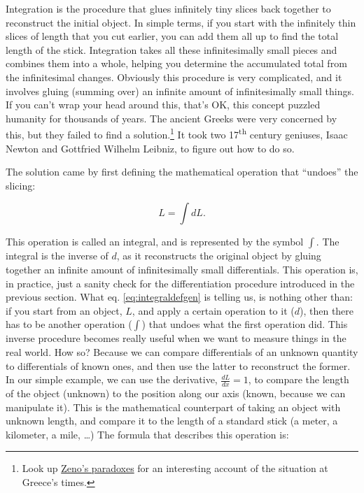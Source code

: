\documentclass[
  9pt,
]{extbook}
\theoremstyle{definition}
\theoremstyle{definition}
\theoremstyle{definition}
\theoremstyle{remark}
\begin{document}
Integration is the procedure that glues infinitely tiny slices back together to reconstruct the initial object. In simple terms, if you start with the infinitely thin slices of length that you cut earlier, you can add them all up to find the total length of the stick. Integration takes all these infinitesimally small pieces and combines them into a whole, helping you determine the accumulated total from the infinitesimal changes. Obviously this procedure is very complicated, and it involves gluing (summing over) an infinite amount of infinitesimally small things. If you can't wrap your head around this, that's OK, this concept puzzled humanity for thousands of years. The ancient Greeks were very concerned by this, but they failed to find a solution.\footnote{Look up \href{https://en.wikipedia.org/wiki/Zeno\%27s_paradoxes}{Zeno's paradoxes} for an interesting account of the situation at Greece's times.} It took two 17\textsuperscript{th} century geniuses, Isaac Newton and Gottfried Wilhelm Leibniz, to figure out how to do so.

The solution came by first defining the mathematical operation that ``undoes'' the slicing:

\begin{equation}
L = \int dL.
\label{eq:integraldefgen}
\end{equation}

This operation is called an integral, and is represented by the symbol \(\int\). The integral is the inverse of \(d\), as it reconstructs the original object by gluing together an infinite amount of infinitesimally small differentials. This operation is, in practice, just a sanity check for the differentiation procedure introduced in the previous section. What eq. \eqref{eq:integraldefgen} is telling us, is nothing other than: if you start from an object, \(L\), and apply a certain operation to it (\(d\)), then there has to be another operation (\(\int\)) that undoes what the first operation did. This inverse procedure becomes really useful when we want to measure things in the real world. How so? Because we can compare differentials of an unknown quantity to differentials of known ones, and then use the latter to reconstruct the former. In our simple example, we can use the derivative, \(\frac{dL}{dx}=1\), to compare the length of the object (unknown) to the position along our axis (known, because we can manipulate it). This is the mathematical counterpart of taking an object with unknown length, and compare it to the length of a standard stick (a meter, a kilometer, a mile, \ldots) The formula that describes this operation is:
\end{document}
